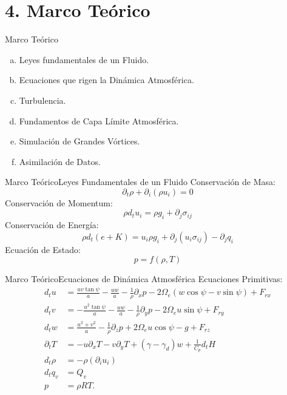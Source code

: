 \documentclass[mathserif,10pt]{beamer}
\newcommand{\be}{\begin{equation}}
\newcommand{\ee}{\end{equation}}
\begin{document}
\section{4. Marco Teórico}
\begin{frame}{Marco Teórico}
	\begin{enumerate}[a.]
		\item Leyes fundamentales de un Fluido.
		\item Ecuaciones que rigen la Dinámica Atmosférica.
		\item Turbulencia.
		\item Fundamentos de Capa Límite Atmosférica.
		\item Simulación de Grandes Vórtices.
		\item Asimilación de Datos.
	\end{enumerate}
\end{frame}

\begin{frame}{Marco Teórico}{Leyes Fundamentales de un Fluido}
	Conservación de Masa:
	\be \partial_t \rho + \partial_i(\rho u_i) = 0 \ee
	Conservación de Momentum:
	\be \rho d_t u_i = \rho g_i + \partial_j\sigma_{ij} \ee
	Conservación de Energía:
	\be \rho d_t\left( e+ K \right) = u_i\rho g_i + \partial_j(u_i \sigma_{ij}) - \partial_j q_i \ee
	Ecuación de Estado:
	\be p = f(\rho,T) \ee
\end{frame}
%
\begin{frame}{Marco Teórico}{Ecuaciones de Dinámica Atmosférica}
Ecuaciones Primitivas:
\small
	\begin{align}
	d_t u &= \frac{uv\tan\psi}{a}-\frac{uw}{a}-\frac{1}{\rho}\partial_x p - 2\Omega_e(w\cos\psi - v\sin\psi) + F_{rx}\\
	d_t v &= -\frac{u^2\tan\psi}{a}-\frac{uw}{a}-\frac{1}{\rho}\partial_y p - 2\Omega_e u\sin\psi + F_{ry}\\
	d_t w &= \frac{u^2 + v^2}{a}-\frac{1}{\rho}\partial_z p + 2\Omega_e u\cos\psi -g + F_{rz}\\
	\partial_t T &= -u\partial_x T -v\partial_y T + (\gamma-\gamma_d)w+\frac{1}{C_p}d_t H\\
	d_t \rho &= -\rho(\partial_i u_i)\\
	d_t q_v &= Q_v\label{03_eq:humedad}\\
	p &= \rho R T.
	\end{align}
\normalsize
\end{frame}
\end{document}
